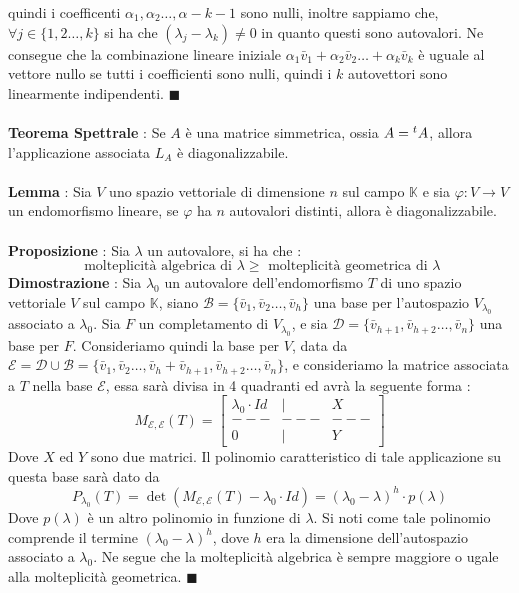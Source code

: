 \documentclass[12pt, letterpaper]{article}
\newcommand{\K}{{\mathbb K}}
\newcommand{\E}{{\mathcal E}}
\newcommand{\B}{{\mathcal B}}
\newcommand{\ve}{{\bar v}}
\newcommand{\acc}{\\\hphantom{}\\}
\begin{document}
quindi i coefficenti \(\alpha_1,\alpha_2\dots,\alpha-{k-1}\) sono nulli, inoltre sappiamo che, 
\(\forall j\in\{1,2\dots,k\}\) si ha che \((\lambda_j-\lambda_k)\ne 0\) in quanto questi sono autovalori. Ne consegue che 
la combinazione lineare iniziale  \(\alpha_1\ve_1+\alpha_2\ve_2\dots+\alpha_k\ve_k\) è uguale al vettore nullo se 
tutti i coefficienti sono nulli, quindi i \(k\) autovettori sono linearmente indipendenti. \(\blacksquare\)\acc 
\textbf{Teorema Spettrale} : Se \(A\) è una matrice simmetrica, ossia \(A=\text{\hphantom{}}^tA\), allora 
l'applicazione associata \(L_A\) è diagonalizzabile.\acc 
\textbf{Lemma} : Sia \(V\) uno spazio vettoriale di dimensione \(n\) sul campo \(\K\)  e sia \(\varphi:V\rightarrow V\) un endomorfismo 
lineare, se \(\varphi\) ha \(n\) autovalori distinti, allora è diagonalizzabile.\acc 
\textbf{Proposizione} : Sia \(\lambda\) un autovalore, si ha che :
$$\text{ molteplicità algebrica di }\lambda\ge \text{ molteplicità geometrica di }\lambda$$ 
\textbf{Dimostrazione} : Sia \(\lambda_0\) un autovalore dell'endomorfismo \(T\) di uno spazio vettoriale \(V\) sul campo 
\(\K\), siano \(\B=\{\ve_1,\ve_2\dots,\ve_h\}\) una base per l'autospazio \(V_{\lambda_0}\) associato a \(\lambda_0\). 
Sia \(F\) un completamento di \(V_{\lambda_0}\), e sia \(\mathcal{D}=\{\ve_{h+1},\ve_{h+2}\dots,\ve_n\}\) una base per \(F\).
Consideriamo quindi la base per \(V\), data da \(\E=\mathcal{D}\cup \B=\{\ve_1,\ve_2\dots,\ve_h+\ve_{h+1},\ve_{h+2}\dots,\ve_n\}\), 
e consideriamo la matrice associata a \(T\) nella base \(\E\), essa sarà divisa in 4 quadranti ed avrà la seguente 
forma : $$M_{\E,\E}(T)=
\begin{bmatrix}
    \lambda_0\cdot Id&|  &X\\
    ---&---&---\\
    0&|&Y
\end{bmatrix}
$$
Dove \(X\) ed \(Y\) sono due matrici. Il polinomio caratteristico di tale applicazione su questa base sarà dato da
$$P_{\lambda_0}(T)=\det(M_{\E,\E}(T)-\lambda_0 \cdot Id)=(\lambda_0-\lambda)^h \cdot p(\lambda)$$
Dove \(p(\lambda)\) è un altro polinomio in funzione di \(\lambda\). Si noti come tale polinomio 
comprende il termine \((\lambda_0-\lambda)^h\), dove \(h\) era la dimensione dell'autospazio associato 
a \(\lambda_0\). Ne segue che la molteplicità algebrica è sempre maggiore o ugale alla 
molteplicità geometrica. \(\blacksquare\)
\end{document}

